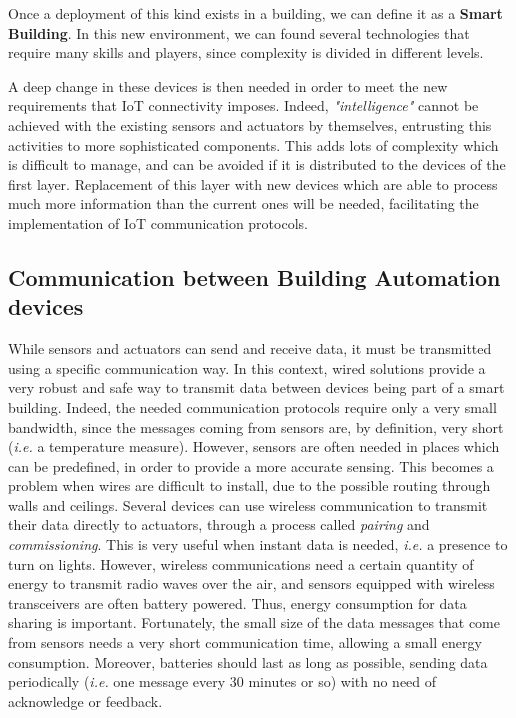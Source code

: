 Once a deployment of this kind exists in a building, we can define it as a \textbf{Smart Building}.
In this new environment, we can found several technologies that require many skills and players, since complexity is divided in different levels.

A deep change in these devices is then needed in order to meet the new requirements that IoT connectivity imposes.
Indeed, \textit{"intelligence"} cannot be achieved with the existing sensors and actuators by themselves, entrusting this activities to more sophisticated components.
This adds lots of complexity which is difficult to manage, and can be avoided if it is distributed to the devices of the first layer.
Replacement of this layer with new devices which are able to process much more information than the current ones will be needed, facilitating the implementation of IoT communication protocols.

\subsection{Communication between Building Automation devices}
While sensors and actuators can send and receive data, it must be transmitted using a specific communication way.
In this context, wired solutions provide a very robust and safe way to transmit data between devices being part of a smart building.
Indeed, the needed communication protocols require only a very small bandwidth, since the messages coming from sensors are, by definition, very short (\textit{i.e.} a temperature measure).
However, sensors are often needed in places which can be predefined, in order to provide a more accurate sensing.
This becomes a problem when wires are difficult to install, due to the possible routing through walls and ceilings.
Several devices can use wireless communication to transmit their data directly to actuators, through a process called \textit{pairing} and \textit{commissioning}.
This is very useful when instant data is needed, \textit{i.e.} a presence to turn on lights.
However, wireless communications need a certain quantity of energy to transmit radio waves over the air, and sensors equipped with wireless transceivers are often battery powered.
Thus, energy consumption for data sharing is important.
Fortunately, the small size of the data messages that come from sensors needs a very short communication time, allowing a small energy consumption.
Moreover, batteries should last as long as possible, sending data periodically (\textit{i.e.} one message every 30 minutes or so) with no need of acknowledge or feedback.

